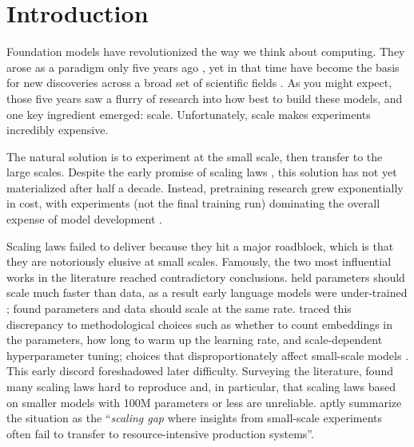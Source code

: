 \section{Introduction}
\label{sec:introduction}

Foundation models have revolutionized the way we think about computing. They arose as a paradigm only five years ago \citep{Bommasani2021FoundationModels}, yet in that time have become the basis for new discoveries across a broad set of scientific fields \citep{Jumper2021HighlyAccurate, Lam2023LearningSkillful, Merchant2023ScalingDeep, Trinh2024SolvingOlympiad, Hubert2026Olympiad}. As you might expect, those five years saw a flurry of research into how best to build these models, and one key ingredient emerged: scale. Unfortunately, scale makes experiments incredibly expensive.


The natural solution is to experiment at the small scale, then transfer to the large scales. Despite the early promise of scaling laws \citep{Kaplan2020ScalingLaws}, this solution has not yet materialized after half a decade. Instead, pretraining research grew exponentially in cost, with experiments (not the final training run) dominating the overall expense of model development \citep{cottier2025risingcoststrainingfrontier, epoch2026randdvstrainingcompute}.

Scaling laws failed to deliver because they hit a major roadblock, which is that they are notoriously elusive at small scales. Famously, the two most influential works in the literature reached contradictory conclusions. \citet{Kaplan2020ScalingLaws} held parameters should scale much faster than data, as a result early language models were under-trained \citep{Brown2020Language, rae2022scalinglanguagemodelsmethods, Chowdhery2023PaLM}; \citet{Hoffmann2022AnEmpirical} found parameters and data should scale at the same rate. \citet{Porian2024Resolving} traced this discrepancy to methodological choices such as whether to count embeddings in the parameters, how long to warm up the learning rate, and scale-dependent hyperparameter tuning; choices that disproportionately affect small-scale models \citep{pearce2024reconciling}. This early discord foreshadowed later difficulty. Surveying the literature, \citet{li2025misfitting} found many scaling laws hard to reproduce and, in particular, that scaling laws based on smaller models with 100M parameters or less are unreliable. \citet{Li2025PredictableScale} aptly summarize the situation as the ``\emph{scaling gap} where insights from small-scale experiments often fail to transfer to resource-intensive production systems''.

